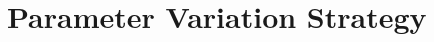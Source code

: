 \section{Parameter Variation Strategy}

\begin{comment}
In order to conduct a comprehensive and methodologically sound performance evaluation of the Keystone Trusted Execution Environment (TEE), a structured parameter variation strategy was employed. The goal of this strategy was to explore how different system and workload configurations affect performance, both inside and outside of the enclave context. By systematically varying a set of key parameters, it becomes possible to isolate the sources of performance overhead and assess the sensitivity of the system to specific operational conditions.

A fundamental aspect of the evaluation involved comparing benchmark execution in two distinct contexts: native execution versus enclave execution. In the native configuration, benchmarks were executed directly within the emulated Linux environment running on QEMU, without invoking Keystone’s enclave infrastructure. This configuration provided a performance baseline that reflects the raw computational capability of the underlying system without the influence of TEE-specific isolation mechanisms. In contrast, enclave execution involved running the same benchmark binaries within Keystone-enforced secure containers. This allowed for a direct measurement of the overhead introduced by features such as memory isolation, limited system call interfaces, and the additional control flow transitions required by the Security Monitor.

To ensure statistical significance and reproducibility, each benchmark was executed multiple times under identical conditions. Specifically, each configuration (e.g., native or enclave) was run ten times, and the results were aggregated to compute average execution time, throughput (expressed as DMIPS for Dhrystone or IPS for CoreMark), as well as the standard deviation across runs. This repetition helped mitigate the impact of transient system noise or timing anomalies that can occur in virtualized environments, especially under QEMU emulation. Additionally, the inclusion of standard deviation in the reported results provided insights into the consistency and stability of the enclave performance.


\end{comment}
